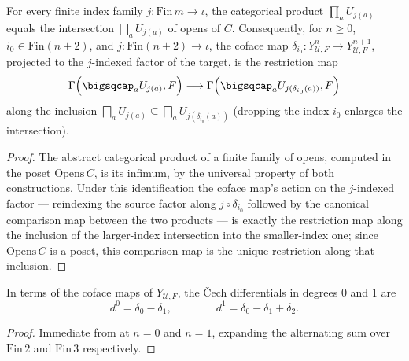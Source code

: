 \begin{lemma}
  \label{lem:adelic_cech_coface_restriction}
  \leanok
  For every finite index family \(j \colon \mathrm{Fin}\, m \to \iota\),
  the categorical product \(\prod_a U_{j(a)}\) equals the intersection
  \(\bigsqcap_a U_{j(a)}\) of opens of \(C\). Consequently, for
  \(n \ge 0\), \(i_0 \in \mathrm{Fin}(n+2)\), and
  \(j \colon \mathrm{Fin}(n+2) \to \iota\), the coface map \(\delta_{i_0}
  \colon Y_{\mathcal{U},F}^n \to Y_{\mathcal{U},F}^{n+1}\), projected to
  the \(j\)-indexed factor of the target, is the restriction map
  \[
    \Gamma\Bigl(\bigsqcap_a U_{j(a)}, F\Bigr) \longrightarrow
    \Gamma\Bigl(\bigsqcap_a U_{j(\delta_{i_0}(a))}, F\Bigr)
  \]
  along the inclusion
  \(\bigsqcap_a U_{j(a)} \subseteq \bigsqcap_a U_{j(\delta_{i_0}(a))}\)
  (dropping the index \(i_0\) enlarges the intersection).
\end{lemma}
\begin{proof}
  \leanok
  The abstract categorical product of a finite family of opens, computed
  in the poset \(\mathrm{Opens}\, C\), is its infimum, by the universal
  property of both constructions. Under this identification the coface
  map's action on the \(j\)-indexed factor --- reindexing the source
  factor along \(j \circ \delta_{i_0}\) followed by the canonical
  comparison map between the two products --- is exactly the restriction
  map along the inclusion of the larger-index intersection into the
  smaller-index one; since \(\mathrm{Opens}\, C\) is a poset, this
  comparison map is the unique restriction along that inclusion.
\end{proof}

\begin{lemma}
  \label{lem:adelic_cech_d01_d12_formula}
  \leanok
  In terms of the coface maps of \(Y_{\mathcal{U}, F}\), the Čech
  differentials in degrees \(0\) and \(1\) are
  \[
    d^0 = \delta_0 - \delta_1, \qquad\qquad
    d^1 = \delta_0 - \delta_1 + \delta_2.
  \]
\end{lemma}
\begin{proof}
  \leanok
  Immediate from  at
  \(n = 0\) and \(n = 1\), expanding the alternating sum over
  \(\mathrm{Fin}\, 2\) and \(\mathrm{Fin}\, 3\) respectively.
\end{proof}

